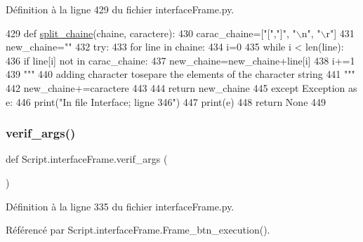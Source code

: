 Définition à la ligne 429 du fichier interface\+Frame.\+py.


\begin{DoxyCode}
429 \textcolor{keyword}{def }\hyperlink{namespaceScript_1_1interfaceFrame_ab554e77db5080fb2eae78e39ebbeb395}{split\_chaine}(chaine, caractere):
430     carac\_chaine=[\textcolor{stringliteral}{"["},\textcolor{stringliteral}{"]"}, \textcolor{stringliteral}{"\(\backslash\)n"}, \textcolor{stringliteral}{"\(\backslash\)r"}]
431     new\_chaine=\textcolor{stringliteral}{""}
432     \textcolor{keywordflow}{try}:
433         \textcolor{keywordflow}{for} line \textcolor{keywordflow}{in} chaine:
434             i=0
435             \textcolor{keywordflow}{while} i < len(line):
436                 \textcolor{keywordflow}{if} line[i] \textcolor{keywordflow}{not} \textcolor{keywordflow}{in} carac\_chaine:
437                     new\_chaine=new\_chaine+line[i]
438                 i+=1
439             \textcolor{stringliteral}{"""
}
440 \textcolor{stringliteral}{            adding character tosepare the elements of the character string
}
441 \textcolor{stringliteral}{            """}
442             new\_chaine+=caractere
443 
444         \textcolor{keywordflow}{return} new\_chaine
445     \textcolor{keywordflow}{except} Exception \textcolor{keyword}{as} e:
446         print(\textcolor{stringliteral}{"In file Interface; ligne 346"})
447         print(e)
448         \textcolor{keywordflow}{return} \textcolor{keywordtype}{None} 
449 \end{DoxyCode}
\mbox{\label{namespaceScript_1_1interfaceFrame_a7a90dd83e0b67edcf2dee870d927e98e}} 
\subsubsection{\texorpdfstring{verif\+\_\+args()}{verif\_args()}}
{\footnotesize\ttfamily def Script.\+interface\+Frame.\+verif\+\_\+args (\begin{DoxyParamCaption}{ }\end{DoxyParamCaption})}



Définition à la ligne 335 du fichier interface\+Frame.\+py.



Référencé par Script.\+interface\+Frame.\+Frame\+\_\+btn\+\_\+execution().



